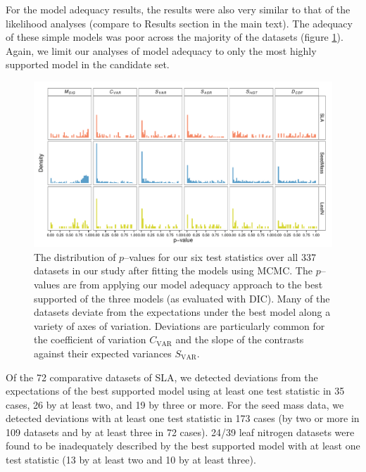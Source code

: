 For the model adequacy results, the results were also very similar to that of the likelihood analyses (compare to Results section in the main text). The adequacy of these simple models was poor across the majority of the datasets (figure \ref{fig:supp-pvalues}). Again, we limit our analyses of model adequacy to only the most highly supported model in the candidate set.

\begin{figure}[p]
  \centering
  \includegraphics[width=\textwidth]{figs/pval-hist-bayes}
  \caption[Distribution of $p$-values for test statistics (Bayesian)]{The distribution of $p$--values for our six test statistics over all 337 datasets in our study after fitting the models using MCMC. The $p$--values are from applying our model adequacy approach to the best supported of the three models (as evaluated with DIC). Many of the datasets deviate from the expectations under the best model along a variety of axes of variation. Deviations are particularly common for the coefficient of variation $C_{\text{VAR}}$ and the slope of the contrasts against their expected variances $S_{\text{VAR}}$.}
  \label{fig:supp-pvalues}
\end{figure}

Of the 72 comparative datasets of SLA, we detected deviations from the expectations of the best supported model using at least one test statistic in 35 cases, 26 by at least two, and 19 by three or more.
For the seed mass data, we detected deviations with at least one test statistic in 173 cases (by two or more in 109 datasets and by at least three in 72 cases).
24/39 leaf nitrogen datasets were found to be inadequately described by the best supported model with at least one test statistic (13 by at least two and 10 by at least three).

